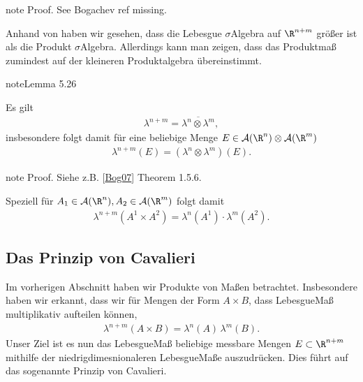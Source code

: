 \documentclass[letterpaper,10pt,german]{jupyterBook}
\begin{document}
\begin{sphinxadmonition}{note}
\sphinxAtStartPar
Proof. See Bogachev ref missing.
\end{sphinxadmonition}

\sphinxAtStartPar
Anhand von {\hyperref[\detokenize{masstheorie/integrationstechnik:ex:prodsig}]{}} haben wir gesehen, dass die Lebesgue \(\sigma\)\sphinxhyphen{}Algebra auf \(\R^{n+m}\) größer ist als die Produkt \(\sigma\)\sphinxhyphen{}Algebra. Allerdings kann man zeigen, dass das Produktmaß zumindest auf der kleineren Produktalgebra übereinstimmt.
\label{masstheorie/integrationstechnik:lem:lebesguecomp}
\begin{sphinxadmonition}{note}{Lemma 5.26}



\sphinxAtStartPar
Es gilt
\begin{equation*}
\begin{split}\lambda^{n+m} = \overline{\lambda^n\otimes\lambda^m},\end{split}
\end{equation*}
\sphinxAtStartPar
insbesondere folgt damit für eine beliebige Menge \(E\in \mathcal{A}(\R^n)\otimes\mathcal{A}(\R^m)\)
\begin{equation*}
\begin{split}\lambda^{n+m}(E) = (\lambda^n\otimes\lambda^m)(E).\end{split}
\end{equation*}\end{sphinxadmonition}

\begin{sphinxadmonition}{note}
\sphinxAtStartPar
Proof. Siehe z.B. {[}\hyperlink{cite.references:id5}{Bog07}{]} Theorem 1.5.6.
\end{sphinxadmonition}

\sphinxAtStartPar
Speziell für \(A_1\in\mathcal{A}(\R^n), A_2\in\mathcal{A}(\R^m)\) folgt damit
\begin{equation*}
\begin{split}\lambda^{n+m}(A^1\times A^2)=\lambda^{n}(A^1)\cdot\lambda^{m}(A^2).\end{split}
\end{equation*}

\subsection{Das Prinzip von Cavalieri}
\label{\detokenize{masstheorie/integrationstechnik:das-prinzip-von-cavalieri}}
\sphinxAtStartPar
Im vorherigen Abschnitt haben wir Produkte von Maßen betrachtet. Insbesondere haben wir erkannt, dass wir für Mengen der Form \(A\times B\), dass Lebesgue\sphinxhyphen{}Maß multiplikativ aufteilen können,
\begin{equation*}
\begin{split}\lambda^{n+m}(A\times B) = \lambda^n(A)\,\lambda^m(B).\end{split}
\end{equation*}
\sphinxAtStartPar
Unser Ziel ist es nun das Lebesgue\sphinxhyphen{}Maß beliebige messbare Mengen \(E\subset\R^{n+m}\) mithilfe der niedrigdimesnionaleren Lebesgue\sphinxhyphen{}Maße auszudrücken. Dies führt auf das sogenannte Prinzip von Cavalieri.
\end{document}
